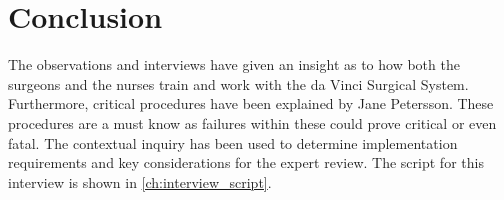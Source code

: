 \section*{Conclusion}
The observations and interviews have given an insight as to how both the surgeons and the nurses train and work with the da Vinci Surgical System. Furthermore, critical procedures have been explained by Jane Petersson. These procedures are a must know as failures within these could prove critical or even fatal. The contextual inquiry has been used to determine implementation requirements and key considerations for the expert review. The script for this interview is shown in \autoref{ch:interview_script}.



%